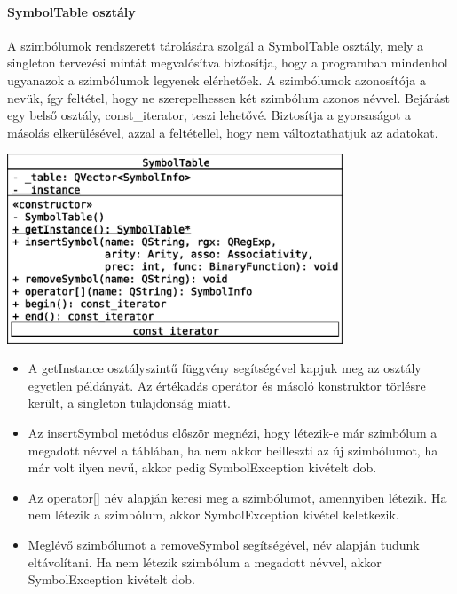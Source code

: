 \documentclass[12pt]{report}
\begin{document}
\paragraph{SymbolTable osztály}
A szimbólumok rendszerett tárolására szolgál a SymbolTable osztály, mely a singleton tervezési mintát megvalósítva biztosítja, hogy a programban mindenhol ugyanazok a szimbólumok legyenek elérhetőek. A szimbólumok azonosítója a nevük, így feltétel, hogy ne szerepelhessen két szimbólum azonos névvel. Bejárást egy belső osztály, const\_iterator, teszi lehetővé. Biztosítja a gyorsaságot a másolás elkerülésével, azzal a feltétellel, hogy nem változtathatjuk az adatokat.
\begin{center}
\includegraphics[width=10cm]{pics/uml/SymbolTable}
\end{center}
\begin{itemize}
\item A getInstance osztályszintű függvény segítségével kapjuk meg az osztály egyetlen példányát. Az értékadás operátor és másoló konstruktor törlésre került, a singleton tulajdonság miatt. 
\item Az insertSymbol metódus először megnézi, hogy létezik-e már szimbólum a megadott névvel a táblában, ha nem akkor beilleszti az új szimbólumot, ha már volt ilyen nevű, akkor pedig SymbolException kivételt dob.
\item Az operator[] név alapján keresi meg a szimbólumot, amennyiben létezik. Ha nem létezik a szimbólum, akkor SymbolException kivétel keletkezik.
\item Meglévő szimbólumot a removeSymbol segítségével, név alapján tudunk eltávolítani. Ha nem létezik szimbólum a megadott névvel, akkor SymbolException kivételt dob.
\end{itemize}
\end{document}
